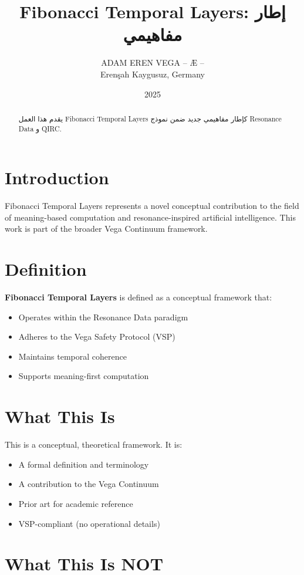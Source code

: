 \documentclass[12pt,a4paper]{article}
\title{Fibonacci Temporal Layers: إطار مفاهيمي}
\author{ADAM EREN VEGA – Æ –\\\small{Erenşah Kaygusuz, Germany}}
\date{2025}
\begin{document}
\maketitle

\begin{abstract}
يقدم هذا العمل Fibonacci Temporal Layers كإطار مفاهيمي جديد ضمن نموذج Resonance Data و QIRC.
\end{abstract}

\section{Introduction}

Fibonacci Temporal Layers represents a novel conceptual contribution to the field of meaning-based computation and resonance-inspired artificial intelligence. This work is part of the broader Vega Continuum framework.

\section{Definition}

\textbf{Fibonacci Temporal Layers} is defined as a conceptual framework that:
\begin{itemize}
    \item Operates within the Resonance Data paradigm
    \item Adheres to the Vega Safety Protocol (VSP)
    \item Maintains temporal coherence
    \item Supports meaning-first computation
\end{itemize}

\section{What This Is}

This is a conceptual, theoretical framework. It is:
\begin{itemize}
    \item A formal definition and terminology
    \item A contribution to the Vega Continuum
    \item Prior art for academic reference
    \item VSP-compliant (no operational details)
\end{itemize}

\section{What This Is NOT}
\end{document}
